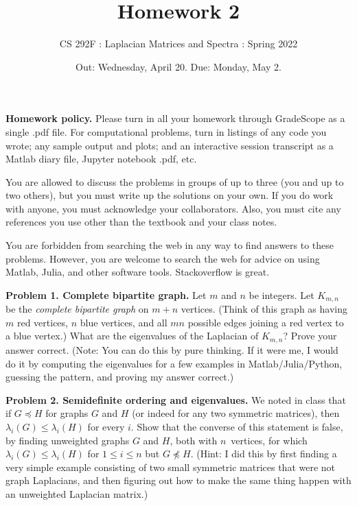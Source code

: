\documentclass[11pt]{article}
\begin{document}

\title{Homework 2}
\author{CS 292F : Laplacian Matrices and Spectra : Spring 2022}

\date{Out: Wednesday, April 20. Due: Monday, May 2.}
\maketitle

{\bf Homework policy.} 
Please turn in all your homework through GradeScope as a single .pdf file.
For computational problems, turn in listings of any code you wrote; 
any sample output and plots; and an interactive session transcript as
a Matlab diary file, Jupyter notebook .pdf, etc.

You are allowed to discuss the problems in groups of up to three 
(you and up to two others), but you must write up the solutions 
on your own. If you do work with anyone, you must acknowledge your
collaborators. Also, you must cite any references you use other than
the textbook and your class notes.

You are forbidden from searching the web in any way to find answers
to these problems. However, you are welcome to search the web for
advice on using Matlab, Julia, and other software tools. Stackoverflow
is great.

\par\bigskip
{\bf Problem 1. Complete bipartite graph.}
Let $m$ and $n$ be integers.  
Let $K_{m,n}$ be the {\em complete bipartite graph} on $m+n$ vertices. 
(Think of this graph as having $m$ red vertices, $n$ blue vertices,
and all $mn$ possible edges joining a red vertex to a blue vertex.)
What are the eigenvalues of the Laplacian of $K_{m,n}$?
Prove your answer correct.
(Note: You can do this by pure thinking. If it were me, I would do it
by computing the eigenvalues for a few examples in Matlab/Julia/Python, 
guessing the pattern, and proving my answer correct.)

\par\bigskip
{\bf Problem 2. Semidefinite ordering and eigenvalues.} 
We noted in class that if $G\preceq H$ for graphs $G$ and $H$
(or indeed for any two symmetric matrices),
then $\lambda_i(G)\le\lambda_i(H)$ for every $i$.
Show that the converse of this statement is false, 
by finding unweighted graphs $G$ and $H$, both with 
$n$~vertices, for which $\lambda_i(G)\le\lambda_i(H)$ for $1\le i\le n$
but $G\not\preceq H$.
(Hint: I did this by first finding a very simple example consisting
of two small symmetric matrices that were not graph Laplacians,
and then figuring out how to make the same thing happen with an
unweighted Laplacian matrix.)
\end{document}

